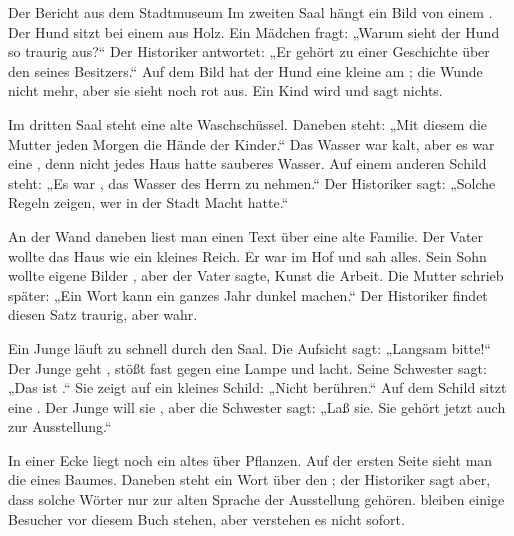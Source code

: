 \documentclass[12pt]{nextbook}
\begin{document}
\begin{readersection}{Der Bericht aus dem Stadtmuseum}
Im zweiten Saal hängt ein Bild von einem  . Der Hund sitzt bei einem  aus Holz. Ein Mädchen fragt: „Warum sieht der Hund so traurig aus?“ Der Historiker antwortet: „Er gehört zu einer Geschichte über den  seines Besitzers.“ Auf dem Bild hat der Hund eine kleine  am ; die Wunde  nicht mehr, aber sie sieht noch rot aus. Ein Kind wird  und sagt nichts.

Im dritten Saal steht eine alte Waschschüssel. Daneben steht: „Mit diesem   die Mutter jeden Morgen die Hände der Kinder.“ Das Wasser war kalt, aber es war eine , denn nicht jedes Haus hatte sauberes Wasser. Auf einem anderen Schild steht: „Es war , das Wasser des Herrn zu nehmen.“ Der Historiker sagt: „Solche Regeln zeigen, wer in der Stadt Macht hatte.“

An der Wand daneben liest man einen Text über eine alte Familie. Der Vater wollte das Haus  wie ein kleines Reich. Er war  im Hof und sah alles. Sein Sohn wollte eigene Bilder , aber der Vater sagte, Kunst  die Arbeit. Die Mutter schrieb später: „Ein  Wort kann ein ganzes Jahr dunkel machen.“ Der Historiker findet diesen Satz traurig, aber wahr.

Ein Junge läuft zu schnell durch den Saal. Die Aufsicht sagt: „Langsam bitte!“ Der Junge geht , stößt fast gegen eine Lampe und lacht. Seine Schwester sagt: „Das ist .“ Sie zeigt auf ein kleines Schild: „Nicht berühren.“ Auf dem Schild sitzt eine . Der Junge will sie , aber die Schwester sagt: „Laß sie. Sie gehört jetzt auch zur Ausstellung.“

In einer Ecke liegt noch ein altes  über Pflanzen. Auf der ersten Seite sieht man die  eines Baumes. Daneben steht ein  Wort über den ; der Historiker sagt aber, dass solche Wörter nur zur alten Sprache der Ausstellung gehören.  bleiben einige Besucher  vor diesem Buch stehen, aber  verstehen es nicht sofort.


\end{readersection}
\end{document}
